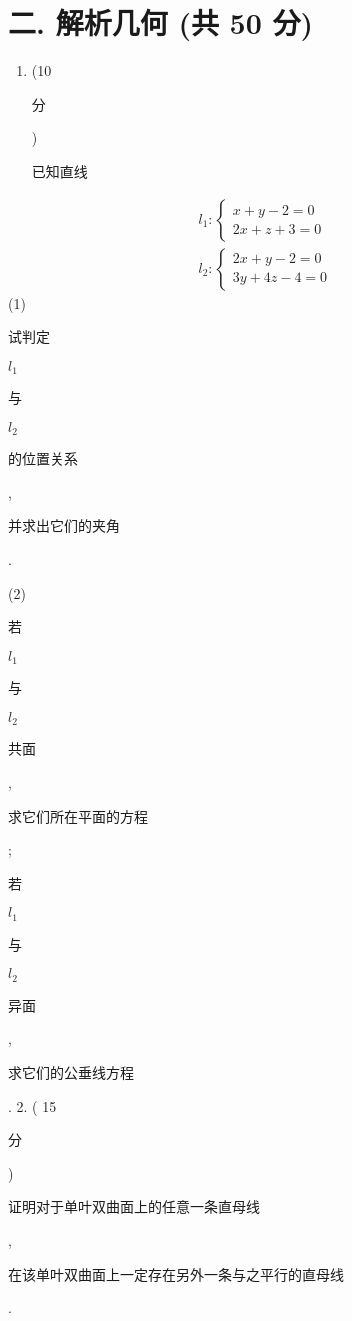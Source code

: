 \documentclass[10pt]{article}
\begin{document}
\section{二. 解析几何 (共 50 分)}
\begin{enumerate}
  \item (10 \begin{CJK}{UTF8}{mj}分\end{CJK}) \begin{CJK}{UTF8}{mj}已知直线\end{CJK}
\end{enumerate}
$$
\begin{aligned}
&l_{1}:\left\{\begin{array}{l}
x+y-2=0 \\
2 x+z+3=0
\end{array}\right. \\
&l_{2}:\left\{\begin{array}{l}
2 x+y-2=0 \\
3 y+4 z-4=0
\end{array}\right.
\end{aligned}
$$
(1) \begin{CJK}{UTF8}{mj}试判定\end{CJK} $l_{1}$ \begin{CJK}{UTF8}{mj}与\end{CJK} $l_{2}$ \begin{CJK}{UTF8}{mj}的位置关系\end{CJK}, \begin{CJK}{UTF8}{mj}并求出它们的夹角\end{CJK}.

(2) \begin{CJK}{UTF8}{mj}若\end{CJK} $l_{1}$ \begin{CJK}{UTF8}{mj}与\end{CJK} $l_{2}$ \begin{CJK}{UTF8}{mj}共面\end{CJK}, \begin{CJK}{UTF8}{mj}求它们所在平面的方程\end{CJK}; \begin{CJK}{UTF8}{mj}若\end{CJK} $l_{1}$ \begin{CJK}{UTF8}{mj}与\end{CJK} $l_{2}$ \begin{CJK}{UTF8}{mj}异面\end{CJK}, \begin{CJK}{UTF8}{mj}求它们的公垂线方程\end{CJK}. 2. ( 15 \begin{CJK}{UTF8}{mj}分\end{CJK}) \begin{CJK}{UTF8}{mj}证明对于单叶双曲面上的任意一条直母线\end{CJK}, \begin{CJK}{UTF8}{mj}在该单叶双曲面上一定存在另外一条与之平行的直母线\end{CJK}.
\end{document}
